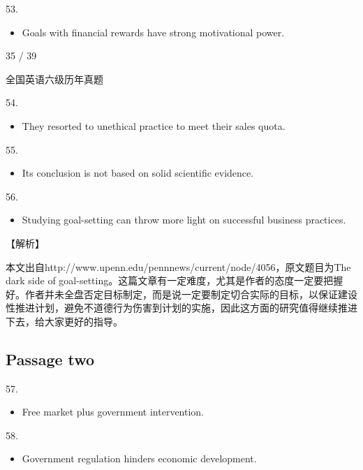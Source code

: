 \documentclass[UTF8,11pt]{ctexart}
\begin{document}
53.


\begin{itemize}[leftmargin=2em,itemsep=.2em,topsep=.4em]\item[A.] Goals with financial rewards have strong motivational power.
\end{itemize}

35 / 39


全国英语六级历年真题


54.


\begin{itemize}[leftmargin=2em,itemsep=.2em,topsep=.4em]\item[B.] They resorted to unethical practice to meet their sales quota.
\end{itemize}

55.


\begin{itemize}[leftmargin=2em,itemsep=.2em,topsep=.4em]\item[B.] Its conclusion is not based on solid scientific evidence.
\end{itemize}

56.


\begin{itemize}[leftmargin=2em,itemsep=.2em,topsep=.4em]\item[A.] Studying goal-setting can throw more light on successful business practices.
\end{itemize}

【解析】


本文出自http://www.upenn.edu/pennnews/current/node/4056，原文题目为The dark side of goal-setting。这篇文章有一定难度，尤其是作者的态度一定要把握好。作者并未全盘否定目标制定，而是说一定要制定切合实际的目标，以保证建设性推进计划，避免不道德行为伤害到计划的实施，因此这方面的研究值得继续推进下去，给大家更好的指导。


\subsection*{\textbf{Passage two}}


57.


\begin{itemize}[leftmargin=2em,itemsep=.2em,topsep=.4em]\item[D.] Free market plus government intervention.
\end{itemize}

58.


\begin{itemize}[leftmargin=2em,itemsep=.2em,topsep=.4em]\item[B.] Government regulation hinders economic development.
\end{itemize}
\end{document}
